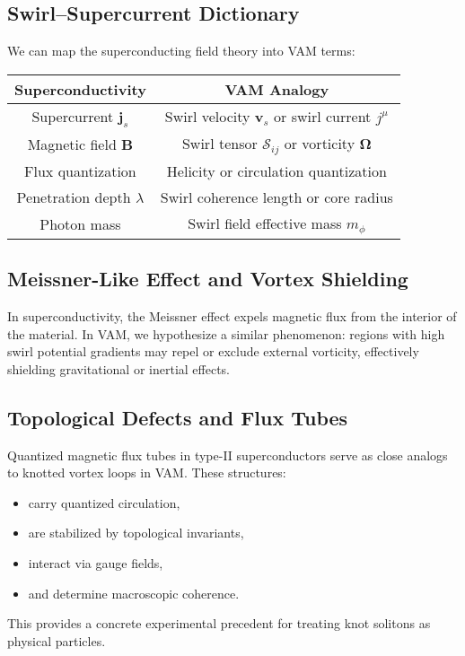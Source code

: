 \subsection{Swirl–Supercurrent Dictionary}
We can map the superconducting field theory into VAM terms:
\begin{center}
    \begin{tabular}{|c|c|}
        \hline
        \textbf{Superconductivity} & \textbf{VAM Analogy} \\
        \hline
        Supercurrent $\mathbf{j}_s$ & Swirl velocity $\mathbf{v}_s$ or swirl current $j^\mu$ \\
        Magnetic field $\mathbf{B}$ & Swirl tensor $\mathcal{S}_{ij}$ or vorticity $\boldsymbol{\Omega}$ \\
        Flux quantization & Helicity or circulation quantization \\
        Penetration depth $\lambda$ & Swirl coherence length or core radius \\
        Photon mass & Swirl field effective mass $m_\phi$ \\
        \hline
    \end{tabular}
\end{center}

\subsection{Meissner-Like Effect and Vortex Shielding}
In superconductivity, the Meissner effect expels magnetic flux from the interior of the material. In VAM, we hypothesize a similar phenomenon: regions with high swirl potential gradients may repel or exclude external vorticity, effectively shielding gravitational or inertial effects.

\subsection{Topological Defects and Flux Tubes}
Quantized magnetic flux tubes in type-II superconductors serve as close analogs to knotted vortex loops in VAM. These structures:
\begin{itemize}
    \item carry quantized circulation,
    \item are stabilized by topological invariants,
    \item interact via gauge fields,
    \item and determine macroscopic coherence.
\end{itemize}
This provides a concrete experimental precedent for treating knot solitons as physical particles.

